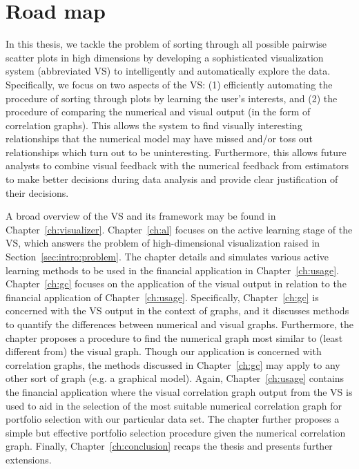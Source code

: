 \section{Road map}
\label{sec:intro:summary}

In this thesis, we tackle the problem of sorting through all possible pairwise
scatter plots in high dimensions by developing a sophisticated visualization
system (abbreviated VS) to intelligently and automatically explore the data. 
Specifically, we focus on two aspects of the VS: 
(1) efficiently automating the procedure of sorting through plots by learning 
the user's interests, and (2) the procedure of comparing the numerical and 
visual output (in the form of correlation graphs).
This allows the system to find visually interesting relationships that the
numerical model may have missed and/or toss out relationships which turn out to
be uninteresting. Furthermore, this allows future analysts to combine visual
feedback with the numerical feedback from estimators to make better decisions
during data analysis and provide clear justification of their decisions.

A broad overview of the VS and its framework may be found in
Chapter~\ref{ch:visualizer}. Chapter~\ref{ch:al} focuses on the active
learning stage of the VS, which answers the problem of high-dimensional 
visualization raised in Section~\ref{sec:intro:problem}. 
The chapter details and simulates various active learning methods to be used in 
the financial application in Chapter~\ref{ch:usage}. 
Chapter~\ref{ch:gc} focuses on the application of the visual output in relation 
to the financial application of Chapter~\ref{ch:usage}. Specifically, 
Chapter~\ref{ch:gc} is concerned with the VS output in the context of graphs, 
and it discusses methods to 
quantify the differences between numerical and visual graphs. Furthermore, the 
chapter proposes a procedure to find the numerical graph most similar to (least 
different from) the visual graph. Though our  application is concerned with 
correlation graphs, the methods discussed in Chapter~\ref{ch:gc} may apply to 
any other sort of graph (e.g. a graphical model). 
Again, Chapter~\ref{ch:usage} contains the financial application where the 
visual correlation graph output from the VS is used to aid in the selection of 
the most suitable numerical correlation graph for portfolio selection with our 
particular data set. The chapter further proposes a simple but effective 
portfolio selection procedure given the numerical correlation graph.
Finally, Chapter~\ref{ch:conclusion} recaps the thesis and presents further 
extensions.

